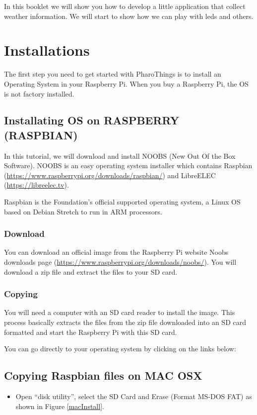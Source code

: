 \documentclass[10pt,twoside,english]{_support/latex/sbabook/sbabook}
\begin{document}
\frontmatter
\pagestyle{plain}

\tableofcontents*
\clearpage\listoffigures

\mainmatter


In this booklet we will show you how to develop a little application that collect weather information. 
We will start to show how we can play with leds and others. 
\chapter{Installations }
The first step you need to get started with PharoThings is to install an Operating System in your Raspberry Pi. When you buy a Raspberry Pi, the OS is not factory installed.
\section{Installating OS on RASPBERRY (RASPBIAN)}
In this tutorial, we will download and install NOOBS (New Out Of the Box Software). NOOBS is an easy operating system installer which contains Raspbian (\url{https://www.raspberrypi.org/downloads/raspbian/}) and LibreELEC (\url{https://libreelec.tv}).

Raspbian is the Foundation’s official supported operating system, a Linux OS based on Debian Stretch to run in ARM processors.
\subsection{Download}
You can download an official image from the Raspberry Pi website Noobs downloads page (\url{https://www.raspberrypi.org/downloads/noobs/}). You will download a zip file and extract the files to your SD card.
\subsection{Copying}
You will need a computer with an SD card reader to install the image.
This process basically extracts the files from the zip file downloaded into an SD card formatted and start the Raspberry Pi with this SD card.

You can go directly to your operating system by clicking on the links below:
\section{Copying Raspbian files on MAC OSX}
\begin{itemize}
\item Open “disk utility”, select the SD Card and Erase (Format MS-DOS FAT) as shown in Figure \ref{macInstall}.
\end{itemize}
\end{document}
